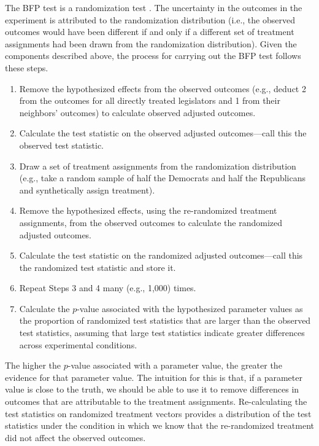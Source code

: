\documentclass[12pt]{article}
\begin{document}
The BFP test is a randomization test \citep{basu2011randomization}. The uncertainty in the outcomes in the experiment is attributed to the randomization distribution (i.e., the observed outcomes would have been different if and only if a different set of treatment assignments had been drawn from the randomization distribution). Given the components described above, the process for carrying out the BFP test follows these steps.
\begin{enumerate}
\item Remove the hypothesized effects from the observed outcomes (e.g., deduct 2 from the outcomes for all directly treated legislators and 1 from their neighbors' outcomes) to calculate observed adjusted outcomes.
\item Calculate the test statistic on the observed adjusted outcomes---call this the observed test statistic.
\item Draw a set of treatment assignments from the randomization distribution (e.g., take a random sample of half the Democrats and half the Republicans and synthetically assign treatment).
\item Remove the hypothesized effects, using the re-randomized treatment assignments, from the observed outcomes to calculate the randomized adjusted outcomes.
\item Calculate the test statistic on the randomized adjusted outcomes---call this the randomized test statistic and store it.
\item Repeat Steps 3 and 4 many (e.g., 1,000) times.
\item Calculate the $p$-value associated with the hypothesized parameter values as the proportion of randomized test statistics that are larger than the observed test statistics, assuming that large test statistics indicate greater differences across experimental conditions.
\end{enumerate} 
The higher the $p$-value associated with a parameter value, the greater the evidence for that parameter value. The intuition for this is that, if a parameter value is close to the truth, we should be able to use it to remove differences in outcomes that are attributable to the treatment assignments. Re-calculating the test statistics on randomized treatment vectors provides a distribution of the test statistics under the condition in which we know that the re-randomized treatment did not affect the observed outcomes. 
\end{document}
